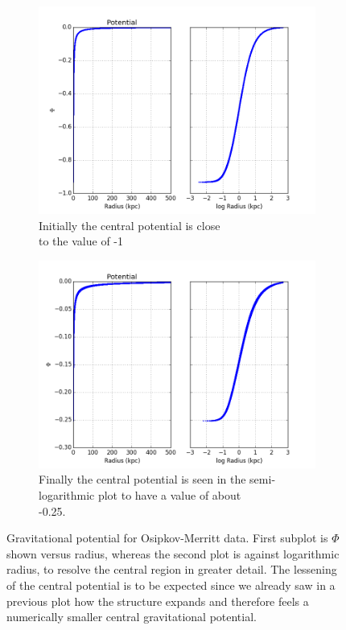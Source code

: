 \begin{figure}
\centering
\begin{subfigure}{.5\textwidth}
  \centering
  \includegraphics[width=1.0\linewidth]{img/Read_OMGOO_IC_3.png}
  \caption{Initially the central potential is close \\ to the value of -1}
  \label{fig:sub1}
\end{subfigure}%
\begin{subfigure}{.5\textwidth}
  \centering
  \includegraphics[width=1.0\linewidth]{img/Read_OMGOO_Final_3.png}
  \caption{Finally the central potential is seen in the semi-logarithmic plot to have a value of about \\ -0.25. }
  \label{fig:sub2}
\end{subfigure}
\caption{Gravitational potential for Osipkov-Merritt data. First subplot is $\Phi$ shown versus radius, whereas the second plot is against logarithmic radius, to resolve the central region in greater detail. The lessening of the central potential is to be expected since we already saw in a previous plot how the structure expands and therefore feels a numerically smaller central gravitational potential.}
\label{fig:test}
\end{figure}

